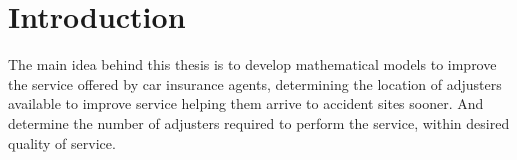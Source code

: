 \chapter{Introduction}

The main idea behind this thesis
is to develop mathematical models
to improve the service offered by car insurance agents,
determining the location
of adjusters available
to improve service
helping them arrive to accident sites sooner.
And determine
the number of adjusters required
to perform the service,
within desired quality of service.






